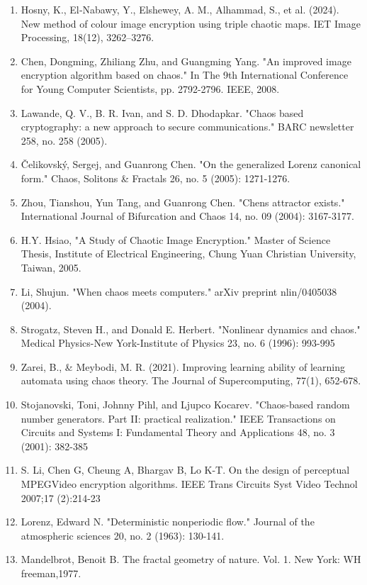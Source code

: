 \begin{enumerate}
\item
  Hosny, K., El‑Nabawy, Y., Elshewey, A. M., Alhammad, S., et al. (2024). New method of colour image encryption using triple chaotic maps. IET Image Processing, 18(12), 3262--3276.
\item
  Chen, Dongming, Zhiliang Zhu, and Guangming Yang. "An improved image encryption algorithm based on chaos." In The 9th International Conference for Young Computer Scientists, pp. 2792-2796. IEEE, 2008.
\item
  Lawande, Q. V., B. R. Ivan, and S. D. Dhodapkar. "Chaos based cryptography: a new approach to secure communications." BARC newsletter 258, no. 258 (2005).
\item
  Čelikovský, Sergej, and Guanrong Chen. "On the generalized Lorenz canonical form." Chaos, Solitons \& Fractals 26, no. 5 (2005): 1271-1276.
\item
  Zhou, Tianshou, Yun Tang, and Guanrong Chen. "Chen\textquotesingle s attractor exists." International Journal of Bifurcation and Chaos 14, no. 09 (2004): 3167-3177.
\item
  H.Y. Hsiao, "A Study of Chaotic Image Encryption." Master of Science Thesis, Institute of Electrical Engineering, Chung Yuan Christian University, Taiwan, 2005.
\item
  Li, Shujun. "When chaos meets computers." arXiv preprint nlin/0405038 (2004).
\item
  Strogatz, Steven H., and Donald E. Herbert. "Nonlinear dynamics and chaos." Medical Physics-New York-Institute of Physics 23, no. 6 (1996): 993-995
\item
  Zarei, B., \& Meybodi, M. R. (2021). Improving learning ability of learning automata using chaos theory. The Journal of Supercomputing, 77(1), 652-678.
\item
  Stojanovski, Toni, Johnny Pihl, and Ljupco Kocarev. "Chaos-based random number generators. Part II: practical realization." IEEE Transactions on Circuits and Systems I: Fundamental Theory and Applications 48, no. 3 (2001): 382-385
\item
  S. Li, Chen G, Cheung A, Bhargav B, Lo K-T. On the design of perceptual MPEGVideo encryption algorithms. IEEE Trans Circuits Syst Video Technol 2007;17 (2):214-23
\item
  Lorenz, Edward N. "Deterministic nonperiodic flow." Journal of the atmospheric sciences 20, no. 2 (1963): 130-141.
\item
  Mandelbrot, Benoit B. The fractal geometry of nature. Vol. 1. New York: WH freeman,1977.

\end{enumerate}
